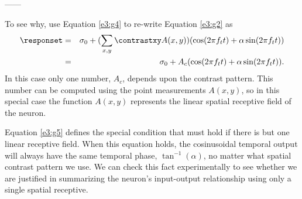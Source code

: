 ------

To see why,
use Equation \ref{e3:g4} to re-write Equation \ref{e3:g2} as
\begin{eqnarray}
\label{e3:g5}
\responset
   & = & \sigma_{0} + (\sum_{x,y} \contrastxy A (x,y) )
   ( \cos ( 2 \pi f_t t ) + \alpha \sin ( 2 \pi f_t t ) ) \nonumber \\
   & = & \sigma_{0}  + A_{c} ( \cos ( 2 \pi f_t t ) + \alpha \sin ( 2 \pi f_t t ) ) .
\end{eqnarray}
In this case only one number,
$A_{c}$, depends upon the contrast pattern.
This number can be computed using the point measurements $A(x,y)$,
so in this special case the function $A(x,y)$ represents
the linear spatial receptive field of the neuron.

Equation \ref{e3:g5} defines the special condition that must
hold if there is but one linear receptive field.
When this equation holds,
the cosinusoidal temporal output
will always have the same temporal phase,
$\tan^{-1} ( \alpha )$, no matter what spatial
contrast pattern we use.
We can check this fact experimentally
to see whether we are justified
in summarizing the neuron's input-output
relationship using only a single 
spatial receptive.
